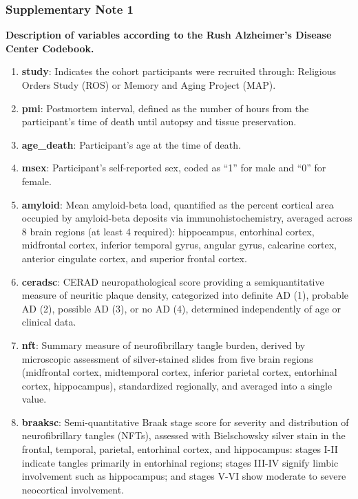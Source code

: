 \subsubsection*{Supplementary Note 1}
\textbf{Description of variables according to the Rush Alzheimer’s Disease Center Codebook.}
\begin{enumerate}
    \item \textbf{study}: Indicates the cohort participants were recruited through: Religious Orders Study (ROS) or Memory and Aging Project (MAP)\supercite{Bennett2018-tn}.
    
    \item \textbf{pmi}: Postmortem interval, defined as the number of hours from the participant’s time of death until autopsy and tissue preservation.
    
    \item \textbf{age\_death}: Participant's age at the time of death.
    
    \item \textbf{msex}: Participant's self-reported sex, coded as “1” for male and “0” for female.
    
    \item \textbf{amyloid}: Mean amyloid-beta load, quantified as the percent cortical area occupied by amyloid-beta deposits via immunohistochemistry, averaged across 8 brain regions (at least 4 required): hippocampus, entorhinal cortex, midfrontal cortex, inferior temporal gyrus, angular gyrus, calcarine cortex, anterior cingulate cortex, and superior frontal cortex.
    
    \item \textbf{ceradsc}: CERAD neuropathological score providing a semiquantitative measure of neuritic plaque density, categorized into definite AD (1), probable AD (2), possible AD (3), or no AD (4), determined independently of age or clinical data.
    
    \item \textbf{nft}: Summary measure of neurofibrillary tangle burden, derived by microscopic assessment of silver-stained slides from five brain regions (midfrontal cortex, midtemporal cortex, inferior parietal cortex, entorhinal cortex, hippocampus), standardized regionally, and averaged into a single value.
    
    \item \textbf{braaksc}: Semi-quantitative Braak stage score for severity and distribution of neurofibrillary tangles (NFTs), assessed with Bielschowsky silver stain in the frontal, temporal, parietal, entorhinal cortex, and hippocampus: stages I-II indicate tangles primarily in entorhinal regions; stages III-IV signify limbic involvement such as hippocampus; and stages V-VI show moderate to severe neocortical involvement.
    

\end{enumerate}
